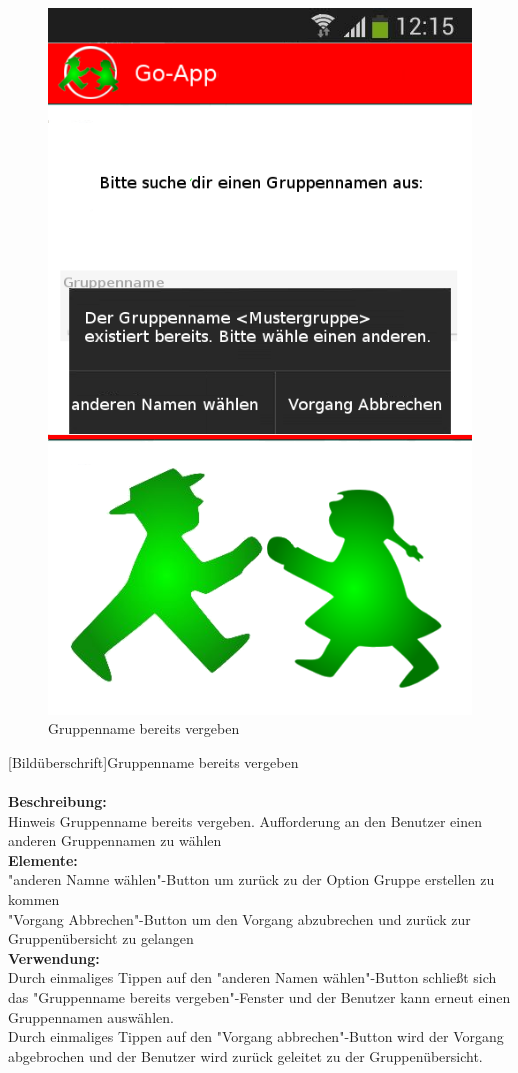 \begin{figure} [H]
	\caption{Gruppenname bereits vergeben}
	\includegraphics[scale =0.5]{resources/images/gruppe_erstellen_ungueltig.png}
\end{figure}
[Bildüberschrift]Gruppenname bereits vergeben\\ \\
\textbf{Beschreibung:}\\
Hinweis Gruppenname bereits vergeben. Aufforderung an den Benutzer einen anderen Gruppennamen zu wählen\\
\textbf{Elemente:}\\
"anderen Namne wählen"-Button um zurück zu der Option Gruppe erstellen zu kommen\\
"Vorgang Abbrechen"-Button um den Vorgang abzubrechen und zurück zur Gruppenübersicht zu gelangen\\
\textbf{Verwendung:}\\
Durch einmaliges Tippen auf den "anderen Namen wählen"-Button schließt sich das "Gruppenname bereits vergeben"-Fenster und der Benutzer kann erneut einen Gruppennamen auswählen.\\
Durch einmaliges Tippen auf den "Vorgang abbrechen"-Button wird der Vorgang abgebrochen und der Benutzer wird zurück geleitet zu der Gruppenübersicht.\\ \\

